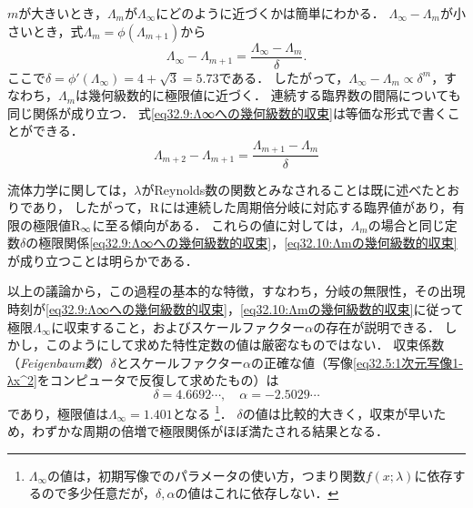 $m$が大きいとき，$\Lambda_m$が$\Lambda_\infty$にどのように近づくかは簡単にわかる．
$\Lambda_\infty - \Lambda_m$が小さいとき，式$\Lambda_m = \phi(\Lambda_{m+1})$から
\begin{equation}\label{eq32.9:Λ∞への幾何級数的収束}
    \Lambda_\infty - \Lambda_{m+1} = \frac{\Lambda_\infty - \Lambda_m}{\delta} .
\end{equation}
ここで$\delta = \phi'(\Lambda_\infty) = 4+\sqrt{3} = 5.73$である．
したがって，$\Lambda_\infty - \Lambda_m \propto \delta^m$，すなわち，$\Lambda_m$は幾何級数的に極限値に近づく．
連続する臨界数の間隔についても同じ関係が成り立つ．
式\eqref{eq32.9:Λ∞への幾何級数的収束}は等価な形式で書くことができる．
\begin{equation}\label{eq32.10:Λmの幾何級数的収束}
    \Lambda_{m+2} - \Lambda_{m+1} = \frac{\Lambda_{m+1} - \Lambda_m}{\delta}
\end{equation}



流体力学に関しては，$\lambda$がReynolds数の関数とみなされることは既に述べたとおりであり，
したがって，$\mathrm{R}$には連続した周期倍分岐に対応する臨界値があり，有限の極限値$\mathrm{R}_\infty$に至る傾向がある．
これらの値に対しては，$\Lambda_m$の場合と同じ定数$\delta$の極限関係\eqref{eq32.9:Λ∞への幾何級数的収束}，\eqref{eq32.10:Λmの幾何級数的収束}が成り立つことは明らかである．




以上の議論から，この過程の基本的な特徴，すなわち，分岐の無限性，その出現時刻が\eqref{eq32.9:Λ∞への幾何級数的収束}，\eqref{eq32.10:Λmの幾何級数的収束}に従って極限$\Lambda_\infty$に収束すること，およびスケールファクター$\alpha$の存在が説明できる．
しかし，このようにして求めた特性定数の値は厳密なものではない．
収束係数（\emph{Feigenbaum数}）$\delta$とスケールファクター$\alpha$の正確な値（写像\eqref{eq32.5:1次元写像1-λx^2}をコンピュータで反復して求めたもの）は
\begin{equation}
    \delta = 4.6692\cdots, \quad
    \alpha = -2.5029\cdots 
\end{equation}
であり，極限値は$\Lambda_\infty=1.401$となる
\footnote{$\Lambda_\infty$の値は，初期写像でのパラメータの使い方，つまり関数$f(x;\lambda)$に依存するので多少任意だが，$\delta,\alpha$の値はこれに依存しない．}．
$\delta$の値は比較的大きく，収束が早いため，わずかな周期の倍増で極限関係がほぼ満たされる結果となる．



